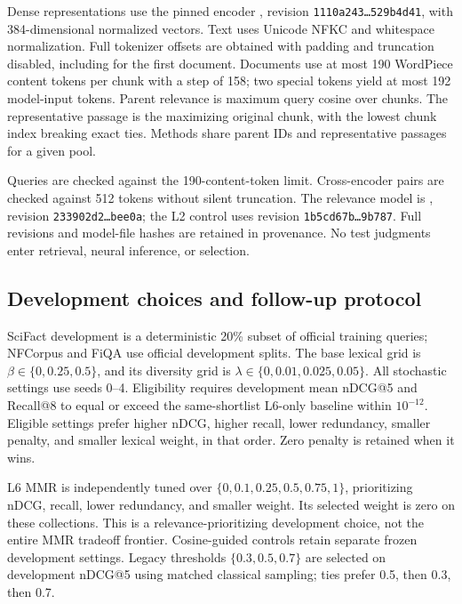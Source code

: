 \documentclass[conference]{IEEEtran}
\begin{document}
Dense representations use the pinned encoder , revision \texttt{1110a243\ldots{}529b4d41}, with 384-dimensional normalized vectors. Text uses Unicode NFKC and whitespace normalization. Full tokenizer offsets are obtained with padding and truncation disabled, including for the first document. Documents use at most 190 WordPiece content tokens per chunk with a step of 158; two special tokens yield at most 192 model-input tokens. Parent relevance is maximum query cosine over chunks. The representative passage is the maximizing original chunk, with the lowest chunk index breaking exact ties. Methods share parent IDs and representative passages for a given pool.

Queries are checked against the 190-content-token limit. Cross-encoder pairs are checked against 512 tokens without silent truncation. The relevance model is , revision \texttt{233902d2\ldots{}bee0a}; the L2 control uses revision \texttt{1b5cd67b\ldots{}9b787}. Full revisions and model-file hashes are retained in provenance. No test judgments enter retrieval, neural inference, or selection.

\subsection{Development choices and follow-up protocol}
SciFact development is a deterministic 20\% subset of official training queries; NFCorpus and FiQA use official development splits. The base lexical grid is \(\beta\in\{0,0.25,0.5\}\), and its diversity grid is \(\lambda\in\{0,0.01,0.025,0.05\}\). All stochastic settings use seeds 0--4. Eligibility requires development mean nDCG@5 and Recall@8 to equal or exceed the same-shortlist L6-only baseline within \(10^{-12}\). Eligible settings prefer higher nDCG, higher recall, lower redundancy, smaller penalty, and smaller lexical weight, in that order. Zero penalty is retained when it wins.

L6 MMR is independently tuned over \(\{0,0.1,0.25,0.5,0.75,1\}\), prioritizing nDCG, recall, lower redundancy, and smaller weight. Its selected weight is zero on these collections. This is a relevance-prioritizing development choice, not the entire MMR tradeoff frontier. Cosine-guided controls retain separate frozen development settings. Legacy thresholds \(\{0.3,0.5,0.7\}\) are selected on development nDCG@5 using matched classical sampling; ties prefer 0.5, then 0.3, then 0.7.
\end{document}
